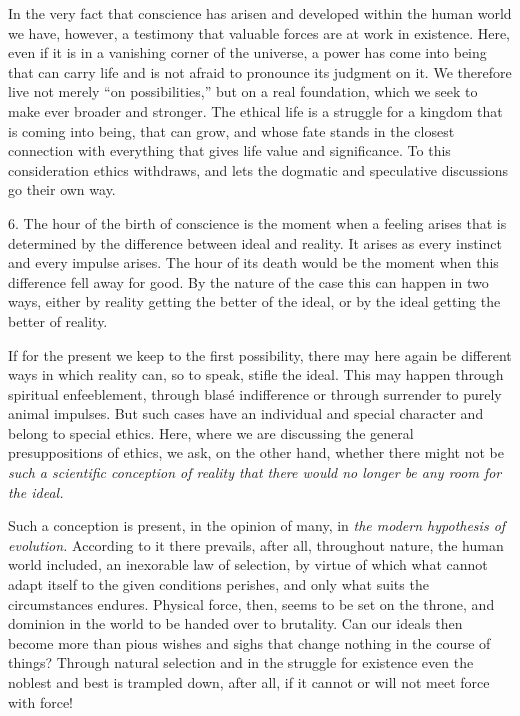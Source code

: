 \documentclass[12pt,a4paper,openany]{book}
\newcommand{\opage}[1]{\marginnote{\footnotesize\textit{[#1]}}}
\begin{document}
In the very fact that conscience has arisen and developed within the human world we have, however, a
testimony that valuable forces are at work in existence. Here, even if it is in a vanishing corner of
the universe, a power has come into being that can carry life and is not afraid to pronounce its
judgment on it. We therefore live not merely ``on possibilities,'' but on a real foundation, which we
seek to make ever broader and stronger. The ethical life is a struggle for a kingdom that is coming into
being, that can grow, and whose fate stands in the closest connection with everything that gives life
value and significance. To this consideration ethics withdraws, and lets the dogmatic and speculative
discussions go their own way.

6. The hour of the birth of conscience is the moment when a feeling arises that is determined by the
difference between ideal and reality. It arises as every instinct and every impulse arises. The hour of
its death would be the moment when this difference fell away for good. By the nature of the case this
can happen in two ways, either by reality getting the better of the ideal, or by the ideal getting the
better of reality.

If for the present we keep to the first possibility, there may here again be different ways in which
reality can, so to speak, stifle the ideal. This may happen through spiritual enfeeblement, through
blasé indifference or through surrender to purely animal impulses. But such cases have an individual
and special character and belong to special ethics. Here, where we are discussing the general
presuppositions of ethics, we ask, on the other hand,
\opage{101}whether there might not be \textit{such a scientific conception of reality that there would no longer
be any room for the ideal.}

Such a conception is present, in the opinion of many, in \textit{the modern hypothesis of evolution.}
According to it there prevails, after all, throughout nature, the human world included, an inexorable
law of selection, by virtue of which what cannot adapt itself to the given conditions perishes, and only
what suits the circumstances endures. Physical force, then, seems to be set on the throne, and dominion
in the world to be handed over to brutality. Can our ideals then become more than pious wishes and sighs
that change nothing in the course of things? Through natural selection and in the struggle for existence
even the noblest and best is trampled down, after all, if it cannot or will not meet force with force!
\end{document}
